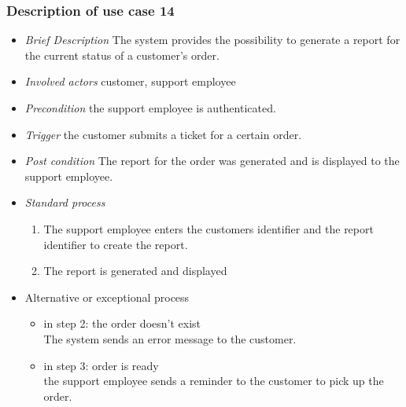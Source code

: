 \subsubsection{Description of use case 14}
\label{decription_uc14}
\begin{itemize}
\item \textit{Brief Description} The system provides the possibility to generate a report for the current status of a customer's order.
\item \textit{Involved actors} customer, support employee
\item \textit{Precondition} the support employee is authenticated.
\item \textit{Trigger} the customer submits a ticket for a certain order.
\item \textit{Post condition} The report for the order was generated and is displayed to the support employee.
\item \textit{Standard process}
\begin{enumerate}
\item The support employee enters the customers identifier and the report identifier to create the report.
\item The report is generated and displayed
\end{enumerate}
\item Alternative or exceptional process
\begin{itemize}
\item in step 2: the order doesn't exist\\
The system sends an error message to the customer.
\item in step 3: order is ready\\
the support employee sends a reminder to the customer to pick up the order.
\end{itemize}
\end{itemize}


